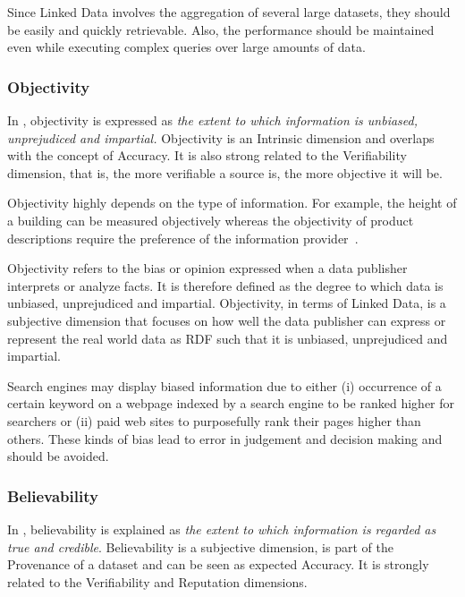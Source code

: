 Since Linked Data involves the aggregation of several large datasets, they should be easily and quickly retrievable.
Also, the performance should be maintained even while executing complex queries over large amounts of data. 

\subsubsection{Objectivity} 
In \cite{Bizerthesis}, objectivity is expressed as \emph{the extent to which information is unbiased, unprejudiced and impartial.}
Objectivity is an Intrinsic dimension and overlaps with the concept of Accuracy.
It is also strong related to the Verifiability dimension, that is, the more verifiable a source is, the more objective it will be.

Objectivity highly depends on the type of information. 
For example, the height of a building can be measured objectively whereas the objectivity of product descriptions require the preference of the information provider~\cite{Bizerthesis}.

\begin{definition}[Objectivity]
Objectivity refers to the bias or opinion expressed when a data publisher interprets or analyze facts.
It is therefore defined as the degree to which data is unbiased, unprejudiced and impartial. 
Objectivity, in terms of Linked Data, is a subjective dimension that focuses on how well the data publisher can express or represent the real world data as RDF such that it is unbiased, unprejudiced and impartial. 
\end{definition}

Search engines may display biased information due to either (i) occurrence of a certain keyword on a webpage indexed by a search engine to be ranked higher for searchers or (ii) paid web sites to purposefully rank their pages higher than others. 
These kinds of bias lead to error in judgement and decision making and should be avoided. 

\subsubsection{Believability}
In \cite{Bizerthesis}, believability is explained as \emph{the extent to which information is regarded as true and credible}.
Believability is a subjective dimension, is part of the Provenance of a dataset and can be seen as expected Accuracy.
It is strongly related to the Verifiability and Reputation dimensions. 

